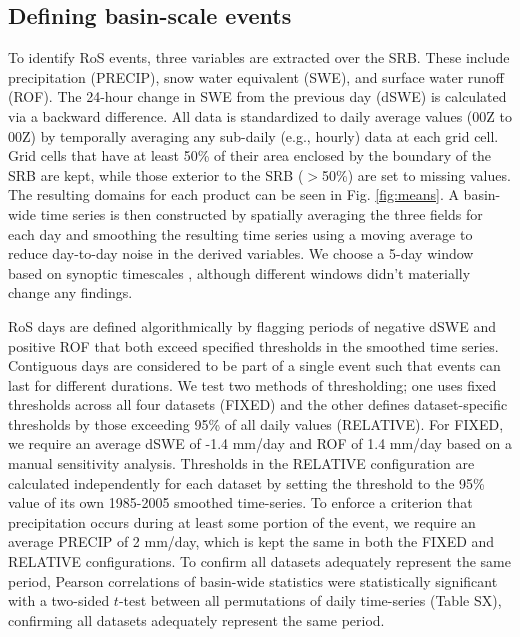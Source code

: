 \documentclass[draft]{agujournal2019}
\begin{document}
\subsection{Defining basin-scale events}

To identify RoS events, three variables are extracted over the SRB. 
These include precipitation (PRECIP), snow water equivalent (SWE), and surface water runoff (ROF). 
The 24-hour change in SWE from the previous day (dSWE) is calculated via a backward difference. 
All data is standardized to daily average values (00Z to 00Z) by temporally averaging any sub-daily (e.g., hourly) data at each grid cell.
Grid cells that have at least 50\% of their area enclosed by the boundary of the SRB are kept, while those exterior to the SRB ($>$50\%) are set to missing values. 
The resulting domains for each product can be seen in Fig. \ref{fig:means}. A basin-wide time series is then constructed by spatially averaging the three fields for each day and smoothing the resulting time series using a moving average to reduce day-to-day noise in the derived variables. 
We choose a 5-day window based on synoptic timescales \citep{holton2004introduction}, although different windows didn't materially change any findings.

RoS days are defined algorithmically by flagging periods of negative dSWE and positive ROF that both exceed specified thresholds in the smoothed time series. Contiguous days are considered to be part of a single event such that events can last for different durations.
We test two methods of thresholding; one uses fixed thresholds across all four datasets (FIXED) and the other defines dataset-specific thresholds by those exceeding 95\% of all daily values (RELATIVE).
For FIXED, we require an average dSWE of -1.4 mm/day and ROF of 1.4 mm/day based on a manual sensitivity analysis. Thresholds in the RELATIVE configuration are calculated independently for each dataset by setting the threshold to the 95\% value of its own 1985-2005 smoothed time-series. To enforce a criterion that precipitation occurs during at least some portion of the event, we require an average PRECIP of 2 mm/day, which is kept the same in both the FIXED and RELATIVE configurations.
To confirm all datasets adequately represent the same period, Pearson correlations of basin-wide statistics were statistically significant with a two-sided $t$-test between all permutations of daily time-series (Table SX), confirming all datasets adequately represent the same period.

\end{document}
